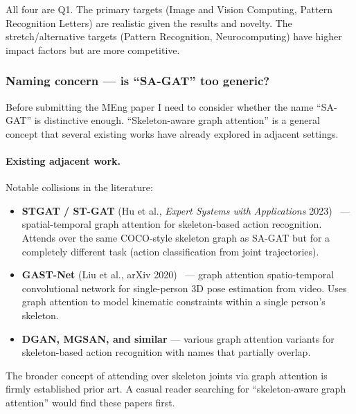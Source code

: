 \vspace{0.5em}

All four are Q1. The primary targets (Image and Vision Computing, Pattern Recognition Letters) are realistic given the results and novelty. The stretch/alternative targets (Pattern Recognition, Neurocomputing) have higher impact factors but are more competitive.


\subsubsection{Naming concern --- is ``SA-GAT'' too generic?}

Before submitting the MEng paper I need to consider whether the name ``SA-GAT'' is distinctive enough. ``Skeleton-aware graph attention'' is a general concept that several existing works have already explored in adjacent settings.

\paragraph{Existing adjacent work.} Notable collisions in the literature:
\begin{itemize}
    \item \textbf{STGAT / ST-GAT} (Hu et al., \emph{Expert Systems with Applications} 2023)~\cite{hu2023stgat} --- spatial-temporal graph attention for skeleton-based action recognition. Attends over the same COCO-style skeleton graph as SA-GAT but for a completely different task (action classification from joint trajectories).
    \item \textbf{GAST-Net} (Liu et al., arXiv 2020)~\cite{liu2020gastnet} --- graph attention spatio-temporal convolutional network for single-person 3D pose estimation from video. Uses graph attention to model kinematic constraints within a single person's skeleton.
    \item \textbf{DGAN, MGSAN, and similar} --- various graph attention variants for skeleton-based action recognition with names that partially overlap.
\end{itemize}

The broader concept of attending over skeleton joints via graph attention is firmly established prior art. A casual reader searching for ``skeleton-aware graph attention'' would find these papers first.

